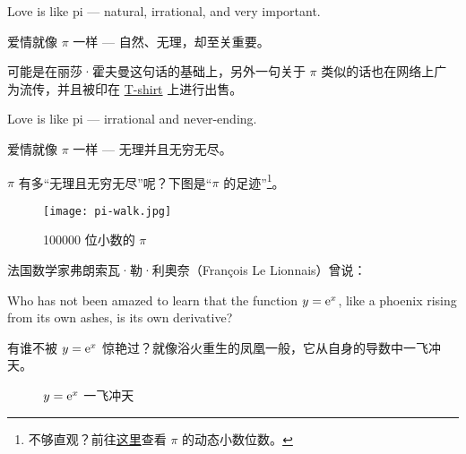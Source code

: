 \documentclass[12pt, cn]{elegantart}
\begin{document}
\begin{tcolorbox}[saying]
Love is like pi --- natural, irrational, and very important.
\vspace{5pt}

爱情就像 $\pi$ 一样 --- 自然、无理，却至关重要。
\end{tcolorbox}

可能是在丽莎·霍夫曼这句话的基础上，另外一句关于 $\pi$ 类似的话也在网络上广为流传，并且被印在 \href{https://teespring.com/shop/love-pi-math}{T-shirt} 上进行出售。
\vspace{5pt}

\begin{tcolorbox}[saying]
Love is like pi --- irrational and never-ending.
\vspace{5pt}

爱情就像 $\pi$ 一样 --- 无理并且无穷无尽。
\end{tcolorbox}

$\pi$ 有多“无理且无穷无尽”呢？下图是“$\pi$ 的足迹”\footnote{不够直观？前往{\href{https://nbremer.github.io/freshdatashapes/\#/pi-walk}{这里}}查看 $\pi$ 的动态小数位数。}。

\begin{figure}[h]
	\centering
	\texttt{[image: pi-walk.jpg]}
	\caption{100000 位小数的 $\pi$}
\end{figure}

\noindent 法国数学家弗朗索瓦·勒·利奧奈（Fran{\c{c}}ois Le Lionnais）曾说：
\vspace{5pt}

\begin{tcolorbox}[saying]
   Who has not been amazed to learn that the function $y = \mathrm{e}^x$, like a phoenix rising from its own ashes, is its own derivative? \vspace{5pt}

   有谁不被 $y = \mathrm{e}^x$ 惊艳过？就像浴火重生的凤凰一般，它从自身的导数中一飞冲天。
\end{tcolorbox}

\begin{figure}[h]
\centering
\caption{$y = \mathrm{e}^x$ 一飞冲天}
\end{figure}
\end{document}
